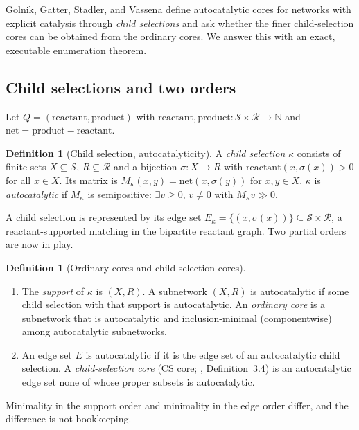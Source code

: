\documentclass[11pt,a4paper]{article}
\theoremstyle{plain}
\theoremstyle{definition}
\newtheorem{definition}[theorem]{Definition}
\theoremstyle{remark}
\newcommand{\N}{\mathbb{N}}
\begin{document}
Golnik, Gatter, Stadler, and Vassena \cite{golnik2026cores} define autocatalytic cores for networks with explicit catalysis through \emph{child selections} and ask whether the finer child-selection cores can be obtained from the ordinary cores. We answer this with an exact, executable enumeration theorem.

\subsection{Child selections and two orders}

Let $Q=(\mathrm{reactant},\mathrm{product})$ with $\mathrm{reactant},\mathrm{product}:\mathcal S\times\mathcal R\to\N$ and $\mathrm{net}=\mathrm{product}-\mathrm{reactant}$.

\begin{definition}[Child selection, autocatalyticity]
A \emph{child selection} $\kappa$ consists of finite sets $X\subseteq\mathcal S$, $R\subseteq\mathcal R$ and a bijection $\sigma:X\to R$ with $\mathrm{reactant}(x,\sigma(x))>0$ for all $x\in X$. Its matrix is $M_\kappa(x,y)=\mathrm{net}(x,\sigma(y))$ for $x,y\in X$. $\kappa$ is \emph{autocatalytic} if $M_\kappa$ is semipositive: $\exists v\ge 0,\,v\neq 0$ with $M_\kappa v\gg 0$.
\end{definition}

A child selection is represented by its edge set $E_\kappa=\{(x,\sigma(x))\}\subseteq\mathcal S\times\mathcal R$, a reactant-supported matching in the bipartite reactant graph. Two partial orders are now in play.

\begin{definition}[Ordinary cores and child-selection cores]
\begin{enumerate}[label=(\roman*)]
\item The \emph{support} of $\kappa$ is $(X,R)$. A subnetwork $(X,R)$ is autocatalytic if some child selection with that support is autocatalytic. An \emph{ordinary core} is a subnetwork that is autocatalytic and inclusion-minimal (componentwise) among autocatalytic subnetworks.
\item An edge set $E$ is autocatalytic if it is the edge set of an autocatalytic child selection. A \emph{child-selection core} (CS core; \cite{golnik2026cores}, Definition~3.4) is an autocatalytic edge set none of whose proper subsets is autocatalytic.
\end{enumerate}
\end{definition}

Minimality in the support order and minimality in the edge order differ, and the difference is not bookkeeping.
\end{document}
